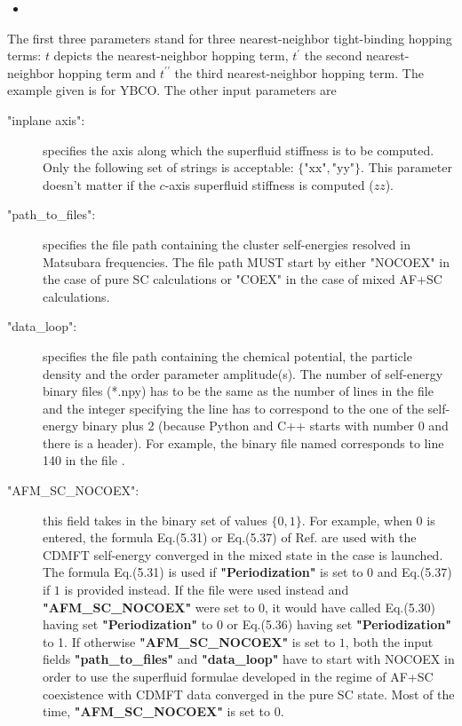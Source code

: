 \documentclass{article}
\newcommand{\juliascript}[4]{
\begin{itemize}
\item[]
\end{itemize}
}
\begin{document}
\juliascript{params.json}{Content of params.json}{1}{17}

The first three parameters stand for three nearest-neighbor tight-binding hopping terms: $t$ depicts the nearest-neighbor hopping term, $t^{\prime}$ the second nearest-neighbor hopping term and $t^{\prime\prime}$ the third nearest-neighbor hopping term. The example given is for YBCO. The other input parameters are 


\begin{description}
\item["inplane axis":] specifies the axis along which the superfluid stiffness is to be computed. Only the following set of strings is acceptable: $\{\text{"xx"},\text{"yy"}\}$. This parameter doesn't matter if the $c$-axis superfluid stiffness is computed ($zz$).
%
\item["path\_to\_files":] specifies the file path containing the cluster self-energies resolved in Matsubara frequencies. The file path MUST start by either "NOCOEX" in the case of pure SC calculations or "COEX" in the case of mixed AF+SC calculations.
%
\item["data\_loop":] specifies the file path containing the chemical potential, the particle density  and the order parameter amplitude(s). The number of self-energy binary files (*.npy) has to be the same as the number of lines in the  file and the integer specifying the line has to correspond to the one of the self-energy binary plus 2 (because Python and C++ starts with number $0$ and there is a header). For example, the binary file named  corresponds to line 140 in the file .
%
\item["AFM\_SC\_NOCOEX":] this field takes in the binary set of values $\{0,1\}$. For example, when $0$ is entered, the formula Eq.(5.31) or Eq.(5.37) of Ref.\cite{simard_master} are used with the CDMFT self-energy converged in the mixed state in the case  is launched. The formula Eq.(5.31) is used if \textbf{"Periodization"} is set to $0$ and Eq.(5.37) if $1$ is provided instead. If the file  were used instead and \textbf{"AFM\_SC\_NOCOEX"} were set to 0, it would have called Eq.(5.30) having set \textbf{"Periodization"} to $0$ or Eq.(5.36) having set \textbf{"Periodization"} to 1. If otherwise \textbf{"AFM\_SC\_NOCOEX"} is set to $1$, both the input fields \textbf{"path\_to\_files"} and \textbf{"data\_loop"} have to start with NOCOEX in order to use the superfluid formulae developed in the regime of AF+SC coexistence with CDMFT data converged in the pure SC state. Most of the time, \textbf{"AFM\_SC\_NOCOEX"} is set to $0$.

\end{description}
\end{document}
